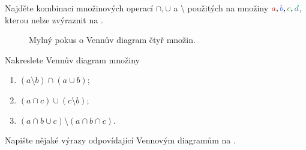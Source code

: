 \begin{hardExercise}
  Najděte kombinaci množinových operací $ \cap , \cup $ a $ \setminus $
  použitých na množiny $\clr{a}, \clb{b}, \clg{c}, \clc{d}$, kterou nelze
  zvýraznit na .
\end{hardExercise}
\begin{figure}[ht]
  \centering

  \caption{Mylný pokus o Vennův diagram čtyř množin.}
  \label{fig:vennuv-diagram-ctyri}
\end{figure}
\begin{exercise}
  Nakreslete Vennův diagram množiny
  \begin{enumerate}
    \item $(a \setminus b) \cap (a \cup b)$;
    \item $(a \cap c) \cup (c \setminus b)$;
    \item $(a \cap b \cup c) \setminus (a \cap b \cap c)$.
  \end{enumerate}
\end{exercise}
\lessboxspace
\begin{exercise}
  Napište nějaké výrazy odpovídající Vennovým diagramům na
  .
\end{exercise}
